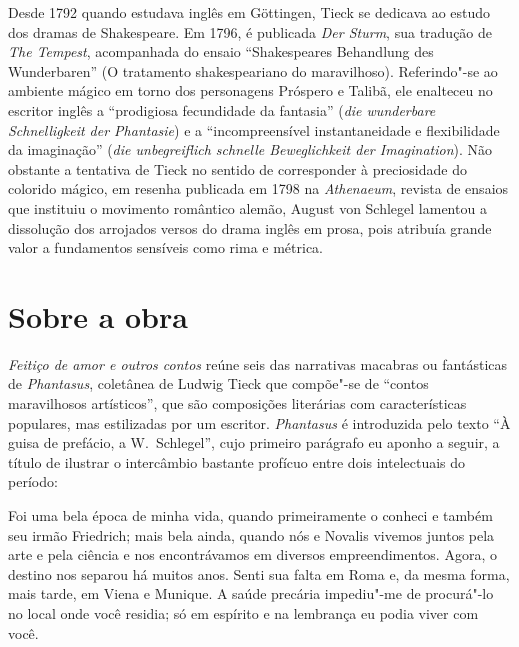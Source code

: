 Desde 1792 quando estudava inglês em Göttingen, Tieck se dedicava ao
estudo dos dramas de Shakespeare. Em 1796, é publicada \textit{Der Sturm}, 
sua tradução de \textit{The Tempest}, acompanhada do ensaio
``Shakespeares Behandlung des Wunderbaren'' (O tratamento shakespeariano
do maravilhoso). Referindo"-se ao ambiente mágico em torno dos
personagens Próspero e Talibã, ele enalteceu no escritor inglês a
``prodigiosa fecundidade da fantasia'' (\textit{die wunderbare Schnelligkeit der
Phantasie}) e a ``incompreensível instantaneidade e flexibilidade da
imaginação'' (\textit{die unbegreiflich schnelle Beweglichkeit der Imagination}).
Não obstante a tentativa de Tieck no sentido de corresponder à
preciosidade do colorido mágico, em resenha publicada em 1798 na
\textit{Athenaeum}, revista de ensaios que instituiu o movimento
romântico alemão, August von Schlegel lamentou a dissolução dos
arrojados versos do drama \mbox{inglês} em prosa, pois atribuía grande 
valor a fundamentos sensíveis como rima e métrica.


\section{Sobre a obra}

\textit{Feitiço de amor e outros contos} reúne seis das narrativas macabras ou fantásticas de \textit{Phantasus}, coletânea de Ludwig Tieck que compõe"-se de ``contos maravilhosos artísticos'', que são composições literárias com características populares, mas estilizadas por um escritor. 
\textit{Phantasus} é introduzida pelo texto ``À guisa de prefácio, 
a W.~Schlegel'', cujo primeiro parágrafo eu aponho a seguir, a título de
ilustrar o intercâmbio bastante profícuo entre dois intelectuais do período:

\begin{hedraquote}
Foi uma bela época de minha vida, quando primeiramente o conheci e
também seu irmão Friedrich; mais bela ainda, quando nós e Novalis
vivemos juntos pela arte e pela ciência e nos encontrávamos em diversos
empreendimentos. Agora, o destino nos separou há muitos anos. Senti sua
falta em Roma e, da mesma forma, mais tarde, em Viena e Munique. A
saúde precária impediu"-me de procurá"-lo no local onde você residia; só
em espírito e na lembrança eu podia viver com você.
\end{hedraquote}
  
